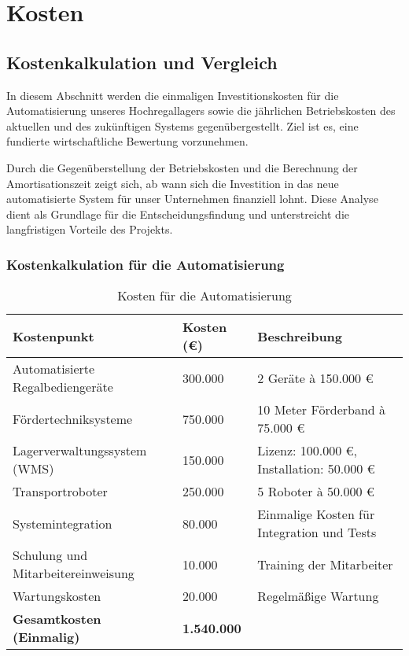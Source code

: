 \chapter{Kosten}
\section*{Kostenkalkulation und Vergleich}
In diesem Abschnitt werden die einmaligen Investitionskosten für die Automatisierung unseres Hochregallagers sowie die jährlichen Betriebskosten des aktuellen und des zukünftigen Systems gegenübergestellt. Ziel ist es, eine fundierte wirtschaftliche Bewertung vorzunehmen.  

Durch die Gegenüberstellung der Betriebskosten und die Berechnung der Amortisationszeit zeigt sich, ab wann sich die Investition in das neue automatisierte System für unser Unternehmen finanziell lohnt. Diese Analyse dient als Grundlage für die Entscheidungsfindung und unterstreicht die langfristigen Vorteile des Projekts.  
\subsection*{Kostenkalkulation für die Automatisierung}

\begin{table}[h!]
	\centering
	\begin{tabular}{|p{8cm}|p{4cm}|p{5cm}|}
		\hline
		\textbf{Kostenpunkt} & \textbf{Kosten (€)} & \textbf{Beschreibung} \\
		\hline
		Automatisierte Regalbediengeräte & 300.000 & 2 Geräte à 150.000 € \\
		\hline
		Fördertechniksysteme & 750.000 & 10 Meter Förderband à 75.000 € \\
		\hline
		Lagerverwaltungssystem (WMS) & 150.000 & Lizenz: 100.000 €, Installation: 50.000 € \\
		\hline
		Transportroboter & 250.000 & 5 Roboter à 50.000 € \\
		\hline
		Systemintegration & 80.000 & Einmalige Kosten für Integration und Tests \\
		\hline
		Schulung und Mitarbeitereinweisung & 10.000 & Training der Mitarbeiter \\
		\hline
		Wartungskosten & 20.000 & Regelmäßige Wartung \\
		\hline
		\textbf{Gesamtkosten (Einmalig)} & \textbf{1.540.000} & \\
		\hline
	\end{tabular}
	\caption{Kosten für die Automatisierung}
\end{table}

